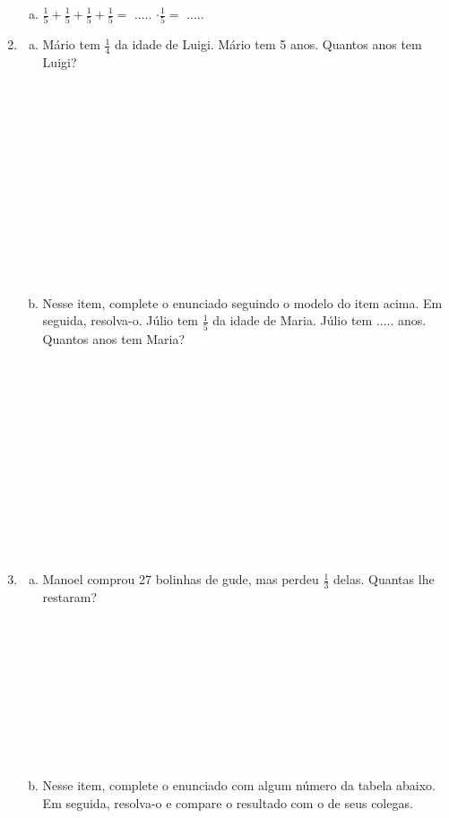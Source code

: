 \documentclass[a4paper,14pt]{article}
\begin{document}
\begin{multicols}{2}
\begin{enumerate}
\begin{enumerate}[a)]
				\item $\frac{1}{5} + \frac{1}{5} + \frac{1}{5} + \frac{1}{5} = $ ..... $\cdot \frac{1}{5} = $ .....
			\end{enumerate}
			\item \begin{enumerate}[a)]
				\item Mário tem $\frac{1}{4}$ da idade de Luigi. Mário tem 5 anos. Quantos anos tem Luigi? \\\\\\\\\\\\\\\\\\\\\\\\\\
				\item Nesse item, complete o enunciado seguindo o modelo do item acima. Em seguida, resolva-o. Júlio tem $\frac{1}{5}$ da idade de Maria. Júlio tem ..... anos. Quantos anos tem Maria? \\\\\\\\\\\\\\\\\\\\\\\\\\
			\end{enumerate}
			\item \begin{enumerate}[a)]
				\item Manoel comprou 27 bolinhas de gude, mas perdeu $\frac{1}{3}$ delas. Quantas lhe restaram?  \\\\\\\\\\\\\\\\\\\\
				\item Nesse item, complete o enunciado com algum número da tabela abaixo. Em seguida, resolva-o e compare o resultado com o de seus colegas. \\

\end{enumerate}
\end{enumerate}
\end{multicols}
\end{document}
